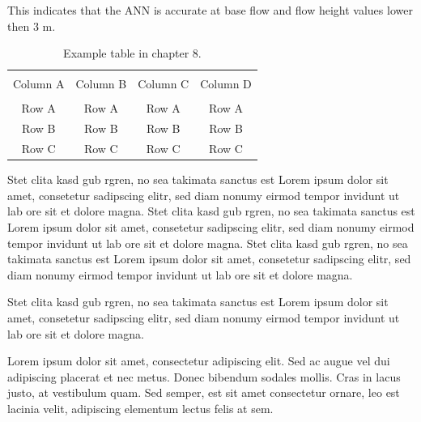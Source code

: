 This indicates that the ANN is accurate at base flow and flow height values lower then 3 m. 

\begin{table}[!htbp]
	{\setlength{\tabcolsep}{14pt}
		\caption{Example table in chapter 8.}
		\begin{center}
			\vspace{-6mm}
			\begin{tabular}{cccc}
				\hline \\[-2.45ex] \hline \\[-2.1ex]
				Column A & Column B & Column C & Column D \\
				\hline \\[-1.8ex]
				Row A & Row A & Row A & Row A \\
				Row B & Row B & Row B & Row B \\
				Row C & Row C & Row C & Row C \\
				[-0ex] \hline
			\end{tabular}
			\vspace{-6mm}
		\end{center}
		\label{Table8.1}}
\end{table}

Stet clita kasd gub rgren, no sea takimata sanctus est Lorem ipsum dolor sit amet, consetetur sadipscing elitr, sed diam nonumy eirmod tempor invidunt ut lab ore sit et dolore magna. Stet clita kasd gub rgren, no sea takimata sanctus est Lorem ipsum dolor sit amet, consetetur sadipscing elitr, sed diam nonumy eirmod tempor invidunt ut lab ore sit et dolore magna. Stet clita kasd gub rgren, no sea takimata sanctus est Lorem ipsum dolor sit amet, consetetur sadipscing elitr, sed diam nonumy eirmod tempor invidunt ut lab ore sit et dolore magna. 

Stet clita kasd gub rgren, no sea takimata sanctus est Lorem ipsum dolor sit amet, consetetur sadipscing elitr, sed diam nonumy eirmod tempor invidunt ut lab ore sit et dolore magna. 


Lorem ipsum dolor sit amet, consectetur adipiscing elit. Sed ac augue vel dui adipiscing placerat et nec metus. Donec bibendum sodales mollis. Cras in lacus justo, at vestibulum quam. Sed semper, est sit amet consectetur ornare, leo est lacinia velit, adipiscing elementum lectus felis at sem.

